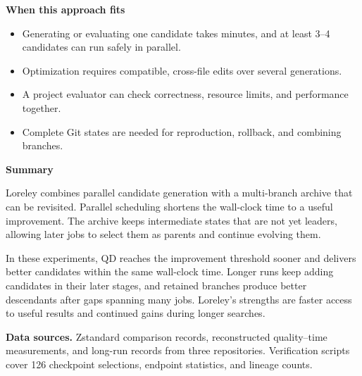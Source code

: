 \documentclass[10pt,a4paper]{article}
\begin{document}
\vspace{7pt}
\begin{minipage}[t]{0.485\textwidth}
{\color{ink}\large\bfseries When this approach fits}\par
\small
\begin{itemize}
  \item Generating or evaluating one candidate takes minutes, and at least 3--4 candidates can run safely in parallel.
  \item Optimization requires compatible, cross-file edits over several generations.
  \item A project evaluator can check correctness, resource limits, and performance together.
  \item Complete Git states are needed for reproduction, rollback, and combining branches.
\end{itemize}
\end{minipage}\hfill
\begin{minipage}[t]{0.485\textwidth}
{\color{ink}\large\bfseries Summary}\par
\small
Loreley combines parallel candidate generation with a multi-branch archive that can be revisited. Parallel scheduling shortens the wall-clock time to a useful improvement. The archive keeps intermediate states that are not yet leaders, allowing later jobs to select them as parents and continue evolving them.\par
In these experiments, QD reaches the improvement threshold sooner and delivers better candidates within the same wall-clock time. Longer runs keep adding candidates in their later stages, and retained branches produce better descendants after gaps spanning many jobs. Loreley's strengths are faster access to useful results and continued gains during longer searches.
\end{minipage}

\vspace{6pt}
\colorbox{surface}{\parbox{\dimexpr\textwidth-2\fboxsep\relax}{%
\scriptsize\textbf{Data sources.}
Zstandard comparison records, reconstructed quality--time measurements, and long-run records from three repositories. Verification scripts cover 126 checkpoint selections, endpoint statistics, and lineage counts.}}

\vspace{3pt}
{\footnotesize
\setlength{\bibsep}{0pt}

}
\end{document}
